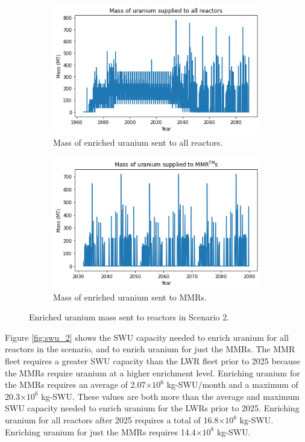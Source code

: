 \begin{figure}
    \centering
    \begin{subfigure}{0.45\textwidth}
        \centering
        \includegraphics[scale=0.4]{../figures/fuelsupply_scenarios_2.png}
        \caption{Mass of enriched uranium sent to all reactors.}
        \label{fig:totalfuel_2}
    \end{subfigure}
    \hspace{0.8cm}
    \begin{subfigure}{0.45\textwidth}
        \centering
        \includegraphics[scale=0.4]{../figures/advancedRX_fuelsupply_scenarios_2.png}
        \caption{Mass of enriched uranium sent to \glspl{MMR}.}
        \label{fig:haleu_2}
    \end{subfigure}
    \caption{Enriched uranium mass sent to reactors in Scenario 2.}
    \label{fig:fuel_2}
\end{figure}

Figure \ref{fig:swu_2} shows the \gls{SWU} capacity needed to 
enrich uranium for all reactors in the scenario, and to enrich uranium for 
just the \glspl{MMR}. The \gls{MMR} fleet requires a greater \gls{SWU} 
capacity than the \gls{LWR} fleet 
prior to 2025 because the \glspl{MMR} require uranium at a higher enrichment 
level. Enriching uranium for the \glspl{MMR} requires an average of 
2.07$\times 10^6$ kg-\gls{SWU}/month and a maximum of 20.3$\times 10^6$ 
kg-\gls{SWU}. These values are both more than the 
average and maximum \gls{SWU} capacity needed to enrich uranium for the 
\glspl{LWR} prior to 2025. Enriching uranium for all reactors after 2025 
requires a total of 16.8$\times 10^8$ kg-SWU. Enriching uranium for 
just the \glspl{MMR} requires 14.4$\times 10^8$ kg-SWU. 

